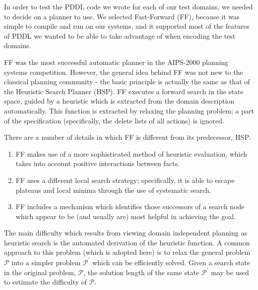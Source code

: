 In order to test the PDDL code we wrote for each of our test domains, we needed to decide on a planner to use. We selected Fast-Forward (FF), because it was simple to compile and run on our systems, and it supported most of the features of PDDL we wanted to be able to take advantage of when encoding the test domains. 

FF was the most successful automatic planner in the AIPS-2000 planning systems competition. However, the general idea behind FF was not new to the classical planning community - the basic principle is actually the same as that of the Heuristic Search Planner (HSP). FF executes a forward search in the state space, guided by a heuristic which is extracted from the domain description automatically. This function is extracted by relaxing the planning problem; a part of the specification (specifically, the delete lists of all actions) is ignored. 

There are a number of details in which FF is different from its predecessor, HSP:
\begin{enumerate}
    \item FF makes use of a more sophisticated method of heuristic evaluation, which takes into account positive interactions between facts.
    \item FF uses a different local search strategy; specifically, it is able to escape plateaus and local minima through the use of systematic search.
    \item FF includes a mechanism which identifies those successors of a search node which appear to be (and usually are) most helpful in achieving the goal. 
\end{enumerate}

The main difficulty which results from viewing domain independent planning as heuristic search is the automated derivation of the heuristic function. A common approach to this problem (which is adopted here) is to relax the general problem $\mathcal{P}$ into a simpler problem $\mathcal{P}^\prime$ which can be efficiently solved. Given a search state in the original problem, $\mathcal{P}$, the solution length of the same state $\mathcal{P}^\prime$ may be used to estimate the difficulty of $\mathcal{P}$. 